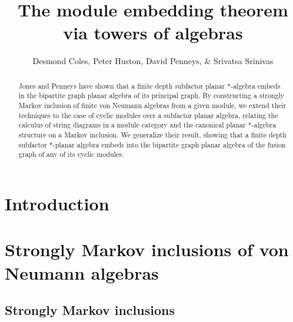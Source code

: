 \documentclass[11pt]{article}
\title{The module embedding theorem via towers of algebras}
\author{Desmond Coles, Peter Huston, David Penneys, \& Srivatsa Srinivas}
\theoremstyle{plain}
\theoremstyle{definition}
\begin{document}

\maketitle
\begin{abstract}
Jones and Penneys have shown that a finite depth subfactor planar $*$-algebra embeds in the bipartite graph planar algebra of its principal graph. By constructing a strongly Markov inclusion of finite von Neumann algebras from a given module, we extend their techniques to the case of cyclic modules over a subfactor planar algebra, relating the calculus of string diagrams in a module category and the canonical planar $*$-algebra structure on a Markov inclusion. We generalize their result, showing that a finite depth subfactor $*$-planar algebra embeds into the bipartite graph planar algebra of the fusion graph of any of its cyclic modules. 
\end{abstract}
\section{Introduction}


\section{Strongly Markov inclusions of von Neumann algebras} 
\label{sec:StronglyMarkovInclusions}


\subsection{Strongly Markov inclusions} 
\end{document}
